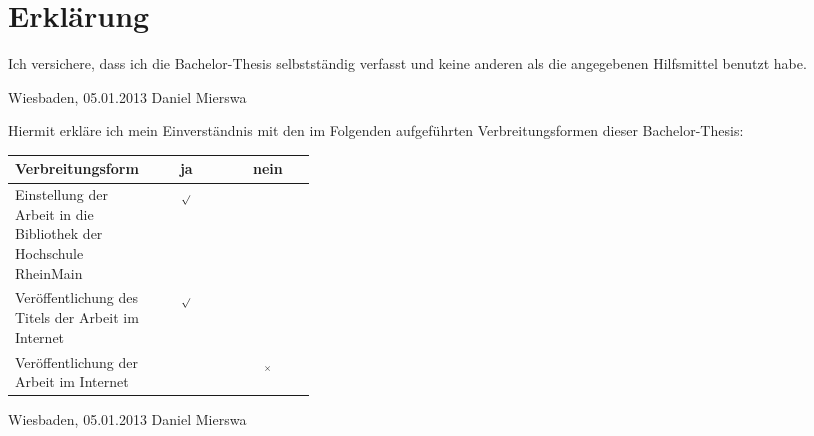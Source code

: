 \pagestyle{plain}
\chapter*{Erklärung}
Ich versichere, dass ich die Bachelor-Thesis selbstständig verfasst und keine
anderen als die angegebenen Hilfsmittel benutzt habe.

\vspace{2cm}

Wiesbaden, 05.01.2013 \hfill{} Daniel Mierswa

\vspace{3cm}
Hiermit erkläre ich mein Einverständnis mit den im Folgenden aufgeführten
Verbreitungsformen dieser Bachelor-Thesis:
\begin{longtable}{|p{0.35\linewidth}|c|c|}
 \hline
 \textbf{Verbreitungsform} & {\centering\textbf{~~ja~~}} & {\centering \textbf{~nein~}} \\
 \hline
 \endhead
 Einstellung der Arbeit in die Bibliothek der Hochschule RheinMain & \centering \( _{\surd } \) &\\
 \hline
 Veröffentlichung des Titels der Arbeit im Internet & \centering \( _{\surd } \) &\\
 \hline
 Veröffentlichung der Arbeit im Internet &  & { \centering \( _{\times } \) } \\
 \hline
\end{longtable}

\vspace{2cm}

Wiesbaden, 05.01.2013 \hfill{} Daniel Mierswa
